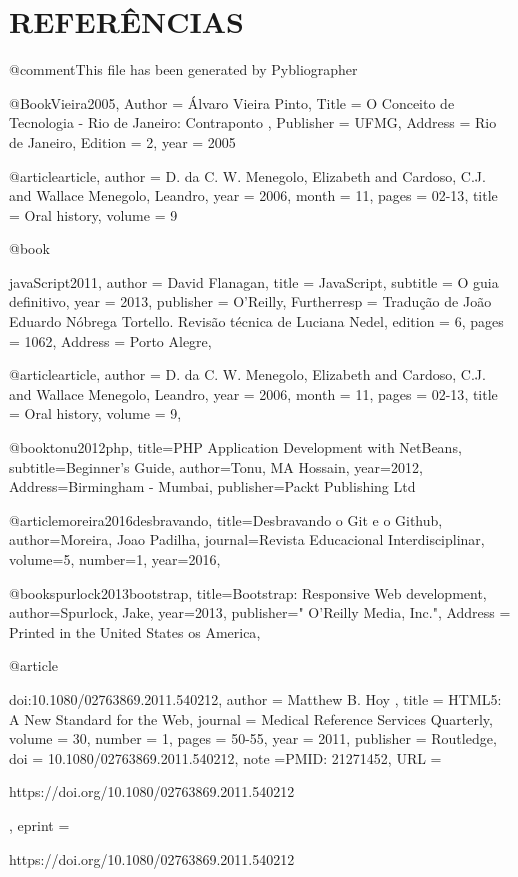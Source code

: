 \chapter{REFERÊNCIAS}
\label{cap:referencias}

@comment{This file has been generated by Pybliographer}



@Book{Vieira2005,
	Author         = {\'Alvaro Vieira Pinto},
	Title          = {O {C}onceito de {T}ecnologia - Rio de Janeiro: Contraponto },
	Publisher      = {UFMG},
	Address        = {Rio de Janeiro},
	Edition        = {2},
	year           = 2005
}

@article{article,
	author = {D. da C. W. Menegolo, Elizabeth and Cardoso, C.J. and Wallace Menegolo, Leandro},
	year = {2006},
	month = {11},
	pages = {02-13},
	title = {Oral history},
	volume = {9}
}

@book{javaScript2011,
	author = {David Flanagan},
	title = {JavaScript},
	subtitle = {O guia definitivo},
	year = {2013},
	publisher = {O'Reilly},
	Furtherresp = {Tradução de João Eduardo Nóbrega Tortello. Revisão técnica de Luciana Nedel},
	edition = {6},
	pages = {1062},
	Address = {Porto Alegre},
	
}

@article{article,
	author = {D. da C. W. Menegolo, Elizabeth and Cardoso, C.J. and Wallace Menegolo, Leandro},
	year = {2006},
	month = {11},
	pages = {02-13},
	title = {Oral history},
	volume = {9},
}


@book{tonu2012php,
	title={PHP Application Development with NetBeans},
	subtitle={Beginner's Guide},
	author={Tonu, MA Hossain},
	year={2012},
	Address={Birmingham - Mumbai},
	publisher={Packt Publishing Ltd}
}

@article{moreira2016desbravando,
	title={Desbravando o Git e o Github},
	author={Moreira, Joao Padilha},
	journal={Revista Educacional Interdisciplinar},
	volume={5},
	number={1},
	year={2016},
}

@book{spurlock2013bootstrap,
	title={Bootstrap: Responsive Web development},
	author={Spurlock, Jake},
	year={2013},
	publisher={" O'Reilly Media, Inc."},
	Address = {Printed in the United States os America},
}



@article{doi:10.1080/02763869.2011.540212,
	author = { Matthew B.   Hoy },
	title = {HTML5: A New Standard for the Web},
	journal = {Medical Reference Services Quarterly},
	volume = {30},
	number = {1},
	pages = {50-55},
	year  = {2011},
	publisher = {Routledge},
	doi = {10.1080/02763869.2011.540212},
	note ={PMID: 21271452},
	URL = { 
		https://doi.org/10.1080/02763869.2011.540212
		
	},
	eprint = { 
		https://doi.org/10.1080/02763869.2011.540212
		
	}
	
}


